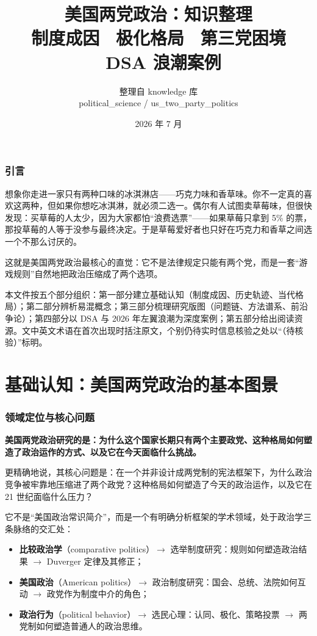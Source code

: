 \documentclass[12pt,a4paper]{ctexart}
\title{\textbf{美国两党政治：知识整理}\\[0.6em]
\large 制度成因 \textbullet\ 极化格局 \textbullet\ 第三党困境 \textbullet\ DSA 浪潮案例}
\author{整理自 knowledge 库 \\ political\_science / us\_two\_party\_politics}
\date{2026 年 7 月}
\begin{document}
\maketitle
\tableofcontents
\clearpage

\section*{引言}

想象你走进一家只有两种口味的冰淇淋店——巧克力味和香草味。你不一定真的喜欢这两种，但如果你想吃冰淇淋，就必须二选一。偶尔有人试图卖草莓味，但很快发现：买草莓的人太少，因为大家都怕``浪费选票''——如果草莓只拿到 5\% 的票，那投草莓的人等于没参与最终决定。于是草莓爱好者也只好在巧克力和香草之间选一个不那么讨厌的。

这就是美国两党政治最核心的直觉：它不是法律规定只能有两个党，而是一套``游戏规则''自然地把政治压缩成了两个选项。

本文件按五个部分组织：第一部分建立基础认知（制度成因、历史轨迹、当代格局）；第二部分辨析易混概念；第三部分梳理研究版图（问题链、方法谱系、前沿争论）；第四部分以 DSA 与 2026 年左翼浪潮为深度案例；第五部分给出阅读资源。文中英文术语在首次出现时括注原文，个别仍待实时信息核验之处以``（待核验）''标明。

\clearpage

\part{基础认知：美国两党政治的基本图景}

\section{领域定位与核心问题}

\textbf{美国两党政治研究的是：为什么这个国家长期只有两个主要政党、这种格局如何塑造了政治运作的方式、以及它在今天面临什么挑战。}

更精确地说，其核心问题是：在一个并非设计成两党制的宪法框架下，为什么政治竞争被牢靠地压缩进了两个政党？这种格局如何塑造了今天的政治运作，以及它在 21 世纪面临什么压力？

它不是``美国政治常识简介''，而是一个有明确分析框架的学术领域，处于政治学三条脉络的交汇处：

\begin{itemize}
  \item \textbf{比较政治学}（comparative politics）$\rightarrow$ 选举制度研究：规则如何塑造政治结果 $\rightarrow$ Duverger 定律及其修正；
  \item \textbf{美国政治}（American politics）$\rightarrow$ 政治制度研究：国会、总统、法院如何互动 $\rightarrow$ 政党作为制度中介的角色；
  \item \textbf{政治行为}（political behavior）$\rightarrow$ 选民心理：认同、极化、策略投票 $\rightarrow$ 两党制如何塑造普通人的政治思维。
\end{itemize}
\end{document}
